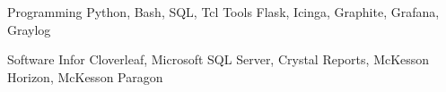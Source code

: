 

\begin{cvskills}

  \cvskill
    {Programming} %
    {Python, Bash, SQL, Tcl} %
\cvskill
    {Tools} %
    {Flask, Icinga, Graphite, Grafana, Graylog} %

  \cvskill
    {Software} %
    {Infor Cloverleaf, Microsoft SQL Server, Crystal Reports, McKesson Horizon, McKesson Paragon} %

\end{cvskills}
